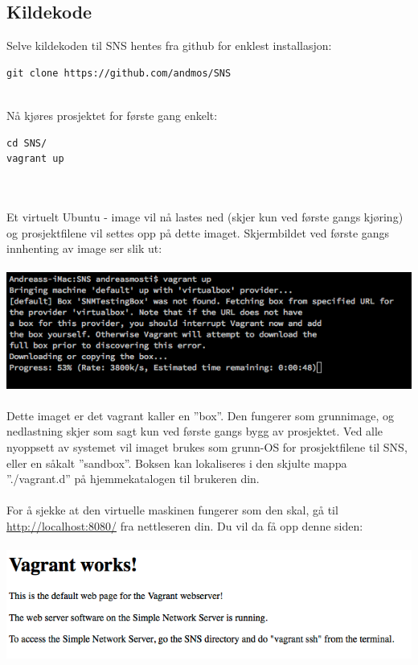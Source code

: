\documentclass{article}
\begin{document}
\subsection{Kildekode}
Selve kildekoden til SNS hentes fra github for enklest installasjon: 

\begin{lstlisting}
git clone https://github.com/andmos/SNS
\end{lstlisting}
\\
Nå kjøres prosjektet for første gang enkelt: 
\begin{lstlisting}
cd SNS/
vagrant up
\end{lstlisting}
\\ \\
Et virtuelt Ubuntu - image vil nå lastes ned (skjer kun ved første gangs kjøring) og prosjektfilene vil settes opp på dette imaget. 
Skjermbildet ved første gangs innhenting av image ser slik ut: \\ \\
\includegraphics[scale = 0.7]{pictures/vagrantFirstTime.png}
\\ \\
Dette imaget er det vagrant kaller en ''box''. Den fungerer som grunnimage, og nedlastning skjer som sagt kun ved første gangs bygg av prosjektet. Ved alle nyoppsett av systemet vil imaget brukes som grunn-OS for prosjektfilene til SNS, eller en såkalt ''sandbox''. Boksen kan lokaliseres i den skjulte mappa ''./vagrant.d'' på hjemmekatalogen til brukeren din. \\ \\
For å sjekke at den virtuelle maskinen fungerer som den skal, gå til \url{http://localhost:8080/} fra nettleseren din. Du vil da få opp denne siden:
\\ \\
\includegraphics[scale = 0.7]{pictures/vagrantWorks.png} 
\\ \\
\end{document}
